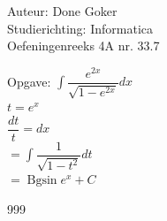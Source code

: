 \documentclass[a4paper]{article}
\begin{document}
  
\noindent \large Auteur: Done Goker \\
\noindent \large Studierichting: Informatica\\
\noindent \large Oefeningenreeks 4A nr. 33.7\\

\medskip

\normalsize

Opgave:
$\displaystyle\int \dfrac{e^{2x}}{\sqrt{1-e^{2x}} }dx$ \\

$t = e^x$ \\

$ \dfrac{dt}{t}  = dx$ \\

$= \displaystyle\int \dfrac{1}{\sqrt{1-t^2}}dt $ \\

$=\operatorname{Bgsin} e^x + C$




\begin{thebibliography}{999}
\end{thebibliography}
\end{document}

